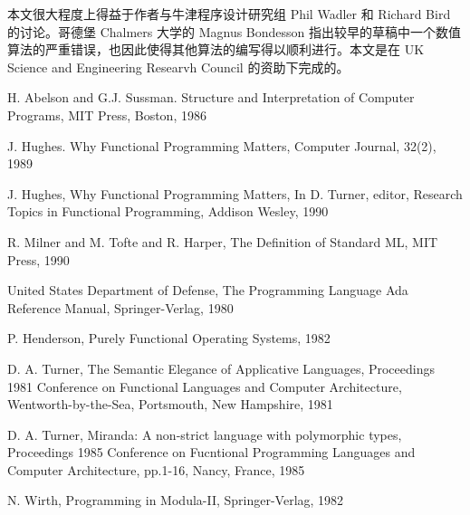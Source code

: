 \documentclass[12pt,a4paper]{article}
\begin{document}
本文很大程度上得益于作者与牛津程序设计研究组 Phil Wadler 和 Richard Bird 的讨论。哥德堡 Chalmers 大学的 Magnus Bondesson 指出较早的草稿中一个数值算法的严重错误，也因此使得其他算法的编写得以顺利进行。本文是在 UK Science and Engineering Researvh Council 的资助下完成的。

\clearpage

\begin{thebibliography}{9}

 H. Abelson and G.J. Sussman. Structure and Interpretation of Computer Programs, MIT Press, Boston, 1986 %

 J. Hughes. Why Functional Programming Matters, Computer Journal, 32(2), 1989

 J. Hughes, Why Functional Programming Matters, In D. Turner, editor, Research Topics in Functional Programming, Addison Wesley, 1990

 R. Milner and M. Tofte and R. Harper, The Definition of Standard ML, MIT Press, 1990

 United States Department of Defense, The Programming Language Ada Reference Manual, Springer-Verlag, 1980

 P. Henderson, Purely Functional Operating Systems, 1982

 D. A. Turner, The Semantic Elegance of Applicative Languages, Proceedings 1981 Conference on Functional Languages and Computer Architecture, Wentworth-by-the-Sea, Portsmouth, New Hampshire, 1981

 D. A. Turner, Miranda: A non-strict language with polymorphic types, Proceedings 1985 Conference on Fucntional Programming Languages and Computer Architecture, pp.1-16, Nancy, France, 1985

 N. Wirth, Programming in Modula-II, Springer-Verlag, 1982

\end{thebibliography}
\end{document}

